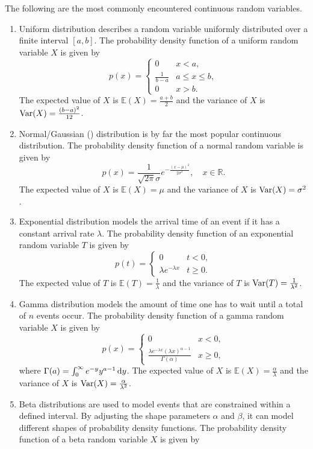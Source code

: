 \documentclass[12pt,letterpaper, onecolumn]{exam}
\begin{document}
\indent\quad The following are the most commonly encountered continuous random variables.

\begin{enumerate}
    \item Uniform distribution describes a random variable uniformly distributed over a finite interval $[a,b]$. The probability density function of a uniform random variable $X$ is given by 
    $$p(x)=\begin{cases}
        0&x<a,\\
        \frac{1}{b-a}&a\le x\le b,\\
        0&x>b.
    \end{cases}$$
    The expected value of $X$ is $\mathbb{E}(X)=\frac{a+b}{2}$ and the variance of $X$ is ${\rm{Var}}(X)=\frac{(b-a)^2}{12}$.
    \item Normal/Gaussian () distribution is by far the most popular continuous distribution. The probability density function of a normal random variable is given by 
    $$p(x)=\frac{1}{\sqrt{2\pi}\sigma}e^{-\frac{(x-\mu)^2}{2\sigma^2}},\quad x\in\mathbb{R}.$$
    The expected value of $X$ is $\mathbb{E}(X)=\mu$ and the variance of $X$ is ${\rm{Var}}(X)=\sigma^2$.
    \item Exponential distribution models the arrival time of an event if it has a constant arrival rate $\lambda$. The probability density function of an exponential random variable $T$ is given by 
    $$p(t)=\begin{cases}
        0&t<0,\\
        \lambda e^{-\lambda x}&t\ge 0.
    \end{cases}$$
    The expected value of $T$ is $\mathbb{E}(T)=\frac{1}{\lambda}$ and the variance of $T$ is ${\rm{Var}}(T)=\frac{1}{\lambda^2}$.
    \item Gamma distribution models the amount of time one has to wait until a total of $n$ events occur. The probability density function of a gamma random variable $X$ is given by
    $$p(x)=\begin{cases}
        0&x<0,\\
        \frac{\lambda e^{-\lambda x}(\lambda x)^{\alpha-1}}{\Gamma(\alpha)}&x\ge 0,
    \end{cases}$$
    where $\Gamma(a)=\int_0^{\infty}e^{-y}y^{a-1}\,{\rm{d}}y$. The expected value of $X$ is $\mathbb{E}(X)=\frac{\alpha}{\lambda}$ and the variance of $X$ is ${\rm{Var}}(X)=\frac{\alpha}{\lambda^2}$.
    \item Beta distributions are used to model events that are constrained within a defined interval. By adjusting the shape parameters $\alpha$ and $\beta$, it can model different shapes of probability density functions. The probability density function of a beta random variable $X$ is given by

\end{enumerate}
\end{document}
